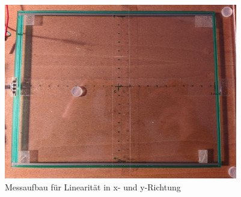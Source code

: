 \begin{figure}[ht!]
    \centering
    \includegraphics[width=0.6\linewidth]{fig/messlinear.jpg}
    \caption{Messaufbau für Linearität in x- und y-Richtung}
    \label{fig:messlinear}
\end{figure}

\begin{figure}[ht!]
    \centering
    
    \caption{}
    \label{fig:xlinear}
    
    \caption{}
    \label{fig:ylinear}
\end{figure}
